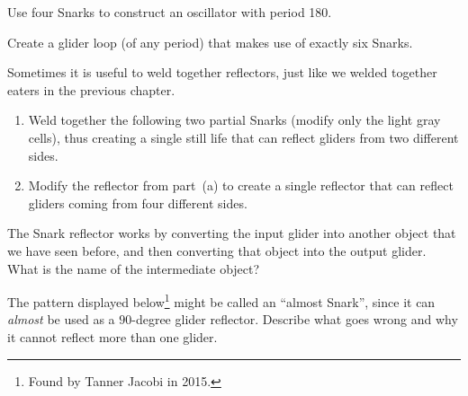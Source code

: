 \begin{multicols}{2}
	
	\mfilbreak
	
	
	\begin{problem}\label{exer:snark_relay_180} 
		Use four Snarks to construct an oscillator with period 180.
	\end{problem}
	
	
	\mfilbreak
	
	
	\begin{problemstar}\label{exer:six_snark_relay} 
		Create a glider loop (of any period) that makes use of exactly six Snarks.
	\end{problemstar}
	
	
	\mfilbreak
	
	
	\begin{problemstar}\label{exer:snark_weld} 
		Sometimes it is useful to weld together reflectors, just like we welded together eaters in the previous chapter.\smallskip
		
		\begin{enumerate}[label=\bf\color{ocre}(\alph*)]
			\item Weld together the following two partial Snarks (modify only the light gray cells), thus creating a single still life that can reflect gliders from two different sides.
			\begin{center}
			\end{center}
			
			\item Modify the reflector from part~(a) to create a single reflector that can reflect gliders coming from four different sides.
		\end{enumerate}
	\end{problemstar}
	
	
	\mfilbreak
	
	
	\begin{problemstar}\label{exer:snark_creates_honeyfarm} 
		The Snark reflector works by converting the input glider into another object that we have seen before, and then converting that object into the output glider. What is the name of the intermediate object?
	\end{problemstar}
	
	
	\mfilbreak
	
	
	\begin{problemstar}\label{exer:almost_snark} 
		The pattern displayed below\footnote{Found by Tanner Jacobi in 2015.} might be called an ``almost Snark'', since it can \emph{almost} be used as a $90$-degree glider reflector. Describe what goes wrong and why it cannot reflect more than one glider.
		

\end{problemstar}
\end{multicols}
